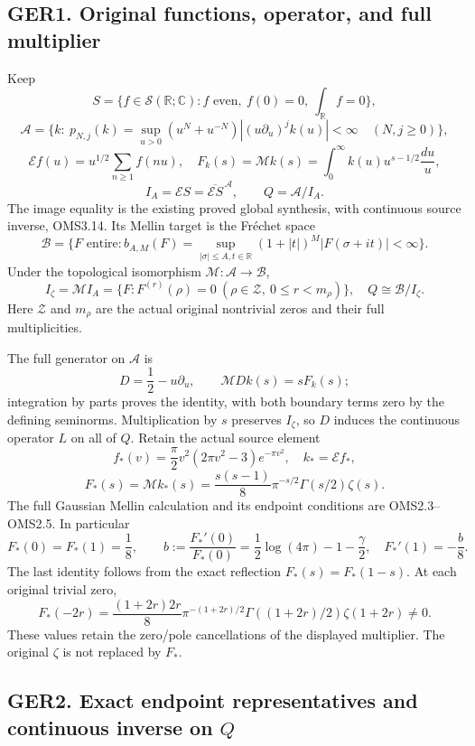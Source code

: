 \subsection{GER1. Original functions, operator, and full
multiplier}\label{ger1.-original-functions-operator-and-full-multiplier}

Keep \[
S=\{f\in\mathcal S(\mathbb R;\mathbb C):f\text{ even},\
f(0)=0,\ \int_{\mathbb R}f=0\},
\] \[
\mathcal A=\{k:\ p_{N,j}(k)=
\sup_{u>0}(u^N+u^{-N})|(u\partial_u)^jk(u)|<\infty
\quad(N,j\ge0)\},
\] \[
\mathcal Ef(u)=u^{1/2}\sum_{n\ge1}f(nu),\quad
F_k(s)=\mathcal Mk(s)=\int_0^\infty k(u)u^{s-1/2}\frac{du}{u},
\] \[
I_A=\mathcal ES=\overline{\mathcal ES}^{\,\mathcal A},\qquad Q=\mathcal A/I_A.
\tag{GER1.1}
\] The image equality is the existing proved global synthesis, with
continuous source inverse, OMS3.14. Its Mellin target is the Fréchet
space \[
\mathcal B=\{F\text{ entire}: b_{A,M}(F)=
\sup_{|\sigma|\le A,t\in\mathbb R}(1+|t|)^M|F(\sigma+it)|<\infty\}.
\] Under the topological isomorphism
\(\mathcal M:\mathcal A\to\mathcal B\), \[
I_\zeta=\mathcal M I_A
=\{F:F^{(r)}(\rho)=0\ (\rho\in\mathcal Z,\ 0\le r<m_\rho)\},
\quad Q\cong\mathcal B/I_\zeta.
\tag{GER1.2}
\] Here \(\mathcal Z\) and \(m_\rho\) are the actual original nontrivial
zeros and their full multiplicities.

The full generator on \(\mathcal A\) is \[
D=\frac12-u\partial_u,\qquad
\mathcal M Dk(s)=sF_k(s);
\tag{GER1.3}
\] integration by parts proves the identity, with both boundary terms
zero by the defining seminorms. Multiplication by \(s\) preserves
\(I_\zeta\), so \(D\) induces the continuous operator \(L\) on all of
\(Q\). Retain the actual source element \[
f_*(v)=\frac\pi2v^2(2\pi v^2-3)e^{-\pi v^2},
\quad k_*=\mathcal Ef_*,
\] \[
F_*(s)=\mathcal Mk_*(s)
=\frac{s(s-1)}8\pi^{-s/2}\Gamma(s/2)\zeta(s).
\tag{GER1.4}
\] The full Gaussian Mellin calculation and its endpoint conditions are
OMS2.3--OMS2.5. In particular \[
F_*(0)=F_*(1)=\frac18,\qquad
b:=\frac{F_*'(0)}{F_*(0)}
=\frac12\log(4\pi)-1-\frac\gamma2,
\quad F_*'(1)=-\frac b8.
\tag{GER1.5}
\] The last identity follows from the exact reflection
\(F_*(s)=F_*(1-s)\). At each original trivial zero, \[
F_*(-2r)=
\frac{(1+2r)2r}{8}\pi^{-(1+2r)/2}
\Gamma((1+2r)/2)\zeta(1+2r)\ne0.
\tag{GER1.6}
\] These values retain the zero/pole cancellations of the displayed
multiplier. The original \(\zeta\) is not replaced by \(F_*\).

\subsection{\texorpdfstring{GER2. Exact endpoint representatives and
continuous inverse on
\(Q\)}{GER2. Exact endpoint representatives and continuous inverse on Q}}\label{ger2.-exact-endpoint-representatives-and-continuous-inverse-on-q}

